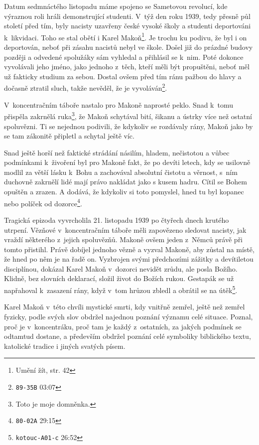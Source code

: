 Datum sedmnáctého listopadu máme spojeno se Sametovou revolucí, kde výraznou
roli hráli demonstrující studenti. V~týž den roku 1939, tedy
přesně půl století před tím, byly nacisty uzavřeny české vysoké školy a studenti
deportováni k~likvidaci. Toho se stal obětí i Karel Makoň\footnote{Umění žít,
str. 42}. Je trochu ku podivu,
že byl i on deportován, neboť při zásahu nacistů nebyl ve škole. Došel již do
prázdné budovy později a odvedené spolužáky sám vyhledal a přihlásil se k~nim.
Poté dokonce vyvolávali jeho jméno, jako jednoho z~těch, kteří měli být
propuštěni, neboť měl už fakticky studium za sebou. Dostal ovšem před tím ránu
pažbou do hlavy a dočasně ztratil sluch, takže nevěděl, že je
vyvoláván\footnote{\texttt{89-35B} 03:07}.

V~koncentračním táboře nastalo pro Makoně naprosté peklo. Snad k~tomu přispěla
zakrnělá ruka\footnote{Toto je moje domněnka.}, že Makoň schytával bití,
šikanu a ústrky více než ostatní spoluvězni. Ti se nejednou podivili, že
kdykoliv se rozdávaly rány, Makoň jako by se tam zákonitě připletl a schytal
ještě víc.

Snad ještě horší než faktické strádání násilím, hladem, nečistotou a vůbec
podmínkami k~živoření byl pro Makoně fakt, že po devíti letech,
kdy se usilovně modlil za větší lásku k~Bohu a zachovával absolutní čistotu a
věrnost, s~ním duchovně zakrnělí lidé mají právo nakládat jako s kusem hadru.
Cítil se Bohem opuštěn a zrazen. A dodává, že kdykoliv si toto pomyslel, hned tu
byl kopanec nebo políček od dozorce\footnote{\texttt{80-02A} 29:15}.

Tragická epizoda vyvrcholila 21. listopadu 1939 po čtyřech dnech krutého utrpení. Vězňové
v~koncentračním táboře měli zapovězeno sledovat nacisty, jak vraždí některého
z~jejich spoluvězňů. Makoně ovšem jeden z~Němců právě při tomto přistihl. Právě
dobíjel jednoho vězně a vyzval Makoně, aby zůstal na místě, že hned po něm je na
řadě on. Vyzbrojen svými předchozími zážitky a devítiletou disciplínou, dokázal
Karel Makoň v~dozorci nevidět zrůdu, ale posla Božího. Klidně, bez slovních deklarací,
složil život do Božích rukou. Gestapák se už napřahoval k~zasazení rány, když
v~tom hrůzou zbledl a obrátil se na útěk\footnote{\texttt{kotouc-A01-c} 26:52}.

Karel Makoň v~této chvíli mystické smrti, kdy vnitřně zemřel, ještě než zemřel
fyzicky, podle svých slov obdržel najednou poznání významu celé situace. Poznal,
proč je v~koncentráku, proč tam je každý z~ostatních, za jakých podmínek se
odtamtud dostane, a především obdržel poznání celé symboliky biblického textu,
katolické tradice i jiných svatých písem.

